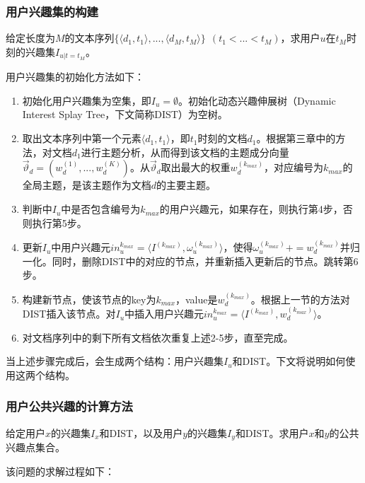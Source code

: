 \subsubsection{用户兴趣集的构建}
\begin{mydef}[用户兴趣集初始化问题]
  给定长度为$M$的文本序列$\{\langle d_1,t_1 \rangle,...,\langle d_M,t_M \rangle\}~~(t_1<...<t_M)$，求用户$u$在$t_M$时刻的兴趣集$I_{u|t=t_M}$。
\end{mydef}

用户兴趣集的初始化方法如下：
\begin{enumerate}
  \item 初始化用户兴趣集为空集，即$I_u=\emptyset$。初始化动态兴趣伸展树（Dynamic Interest Splay Tree，下文简称DIST）为空树。
  \item 取出文本序列中第一个元素$\langle d_1,t_1 \rangle$，即$t_1$时刻的文档$d_1$。根据第三章中的方法，对文档$d_1$进行主题分析，从而得到该文档的主题成分向量$\vec{\vartheta}_d=(w_d^{(1)},...,w_d^{(K)})$。从$\vec{\vartheta}_d$取出最大的权重$w_d^{(k_{max})}$，对应编号为$k_{max}$的全局主题，是该主题作为文档$d$的主要主题。
  \item 判断中$I_u$中是否包含编号为$k_{max}$的用户兴趣元，如果存在，则执行第4步，否则执行第5步。
  \item 更新$I_u$中用户兴趣元$in_u^{k_{max}}=\langle I^{(k_{max})},\omega_u^{(k_{max})}\rangle$，使得$\omega_u^{(k_{max})}+=w_d^{(k_{max})}$并归一化。同时，删除DIST中的对应的节点，并重新插入更新后的节点。跳转第6步。
  \item 构建新节点，使该节点的key为$k_{max}$，value是$w_d^{(k_{max})}$。根据上一节的方法对DIST插入该节点。对$I_u$中插入用户兴趣元$in_u^{k_{max}}=\langle I^{(k_{max})},w_d^{(k_{max})}\rangle$。
  \item 对文档序列中的剩下所有文档依次重复上述2-5步，直至完成。
\end{enumerate}

当上述步骤完成后，会生成两个结构：用户兴趣集$I_u$和DIST。下文将说明如何使用这两个结构。

\subsubsection{用户公共兴趣的计算方法}
\begin{mydef}[用户公共兴趣问题]
给定用户$x$的兴趣集$I_x$和DIST，以及用户$y$的兴趣集$I_y$和DIST。求用户$x$和$y$的公共兴趣点集合。
\end{mydef}

该问题的求解过程如下：
   
